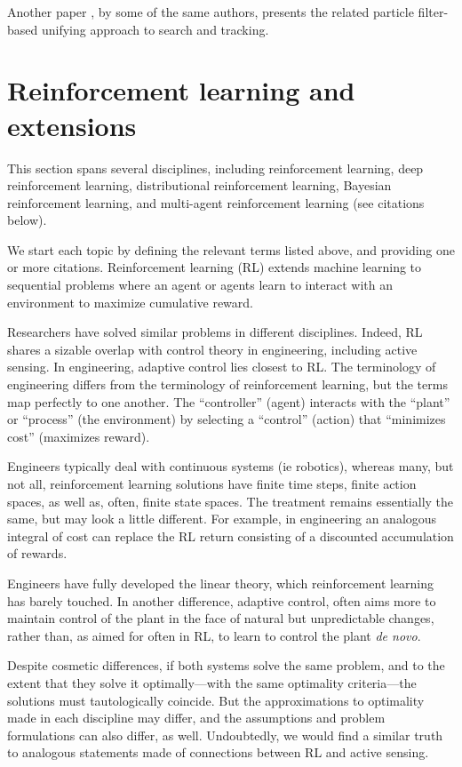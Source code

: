 \documentclass{article}
\begin{document}
Another paper \cite{tisdale2008multiple}, by some of the same authors,
presents the related particle filter-based unifying approach to search
and tracking.


\section{Reinforcement learning and extensions}

This section spans several disciplines, including reinforcement
learning, deep reinforcement learning, distributional reinforcement
learning, Bayesian reinforcement learning, and multi-agent
reinforcement learning (see citations below).

We start each topic by defining the relevant terms listed above, and
providing one or more citations.  Reinforcement learning (RL)
\cite{sutton2018reinforcement, kaelbling1996reinforcement} extends
machine learning to sequential problems where an agent or agents learn
to interact with an environment to maximize cumulative reward.

Researchers have solved similar problems in different disciplines.
Indeed, RL shares a sizable overlap with control theory in
engineering, including active sensing.  In engineering, adaptive
control \cite{aastrom2013adaptive, khan2012reinforcement} lies closest
to RL.  The terminology of engineering differs from the terminology of
reinforcement learning, but the terms map perfectly to one another.
The ``controller'' (agent) interacts with the ``plant'' or ``process''
(the environment) by selecting a ``control'' (action) that ``minimizes
cost'' (maximizes reward).

Engineers typically deal with continuous systems (ie robotics),
whereas many, but not all, reinforcement learning solutions have
finite time steps, finite action spaces, as well as, often, finite
state spaces.  The treatment remains essentially the same, but may
look a little different.  For example, in engineering an analogous
integral of cost can replace the RL return consisting of a discounted
accumulation of rewards.

Engineers have fully developed the linear theory, which reinforcement
learning has barely touched.  In another difference, adaptive control,
often aims more to maintain control of the plant in the face of
natural but unpredictable changes, rather than, as aimed for often in
RL, to learn to control the plant \emph{de novo}.

Despite cosmetic differences, if both systems solve the same problem,
and to the extent that they solve it optimally---with the same
optimality criteria---the solutions must tautologically coincide.  But
the approximations to optimality made in each discipline may differ,
and the assumptions and problem formulations can also differ, as well.
Undoubtedly, we would find a similar truth to analogous statements
made of connections between RL and active sensing.
\end{document}
